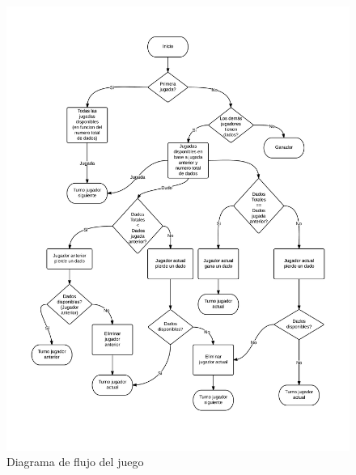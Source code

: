 \documentclass[a4paper,11pt]{article}
\begin{document}
\begin{figure}[h!]
\caption{Diagrama de flujo del juego}
\includegraphics[width=\textwidth]{FlujoDudo.png}
\end{figure}
\end{document}
